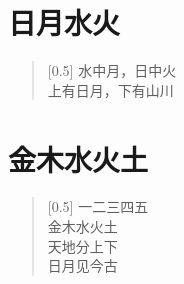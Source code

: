 \documentclass[12pt,UTF-8,openany]{ctexbook}
\begin{document}
\hanzibox{}\hanzibox{}\hanzibox{}\hanzibox{}\hspace{1em}\hanzibox{}\hanzibox{}\hanzibox{}\hanzibox{}

\hanzibox{}\hanzibox{}\hanzibox{}\hanzibox{}\hspace{1em}\hanzibox{}\hanzibox{}\hanzibox{}\hanzibox{}

\hanzibox{}\hanzibox{}\hanzibox{}\hanzibox{}\hspace{1em}




\chapter{日月水火}

\begin{large}
    
    \begin{verse}[0.5\linewidth]
        水中月，日中火 \\
        上有日月，下有山川
    \end{verse}
    
\end{large}


\clearpage

\begin{center}
    
\end{center}


\hanzibox{}\hanzibox{}\hanzibox{}\hanzibox{}\hspace{1em}\hanzibox{}\hanzibox{}\hanzibox{}\hanzibox{}

\hanzibox{}\hanzibox{}\hanzibox{}\hanzibox{}\hspace{1em}\hanzibox{}\hanzibox{}\hanzibox{}\hanzibox{}






\chapter{金木水火土}

\begin{large}
    
    \begin{verse}[0.5\linewidth]
        一二三四五 \\
        金木水火土 \\
        天地分上下 \\
        日月见今古
    \end{verse}
    
\end{large}
\end{document}
